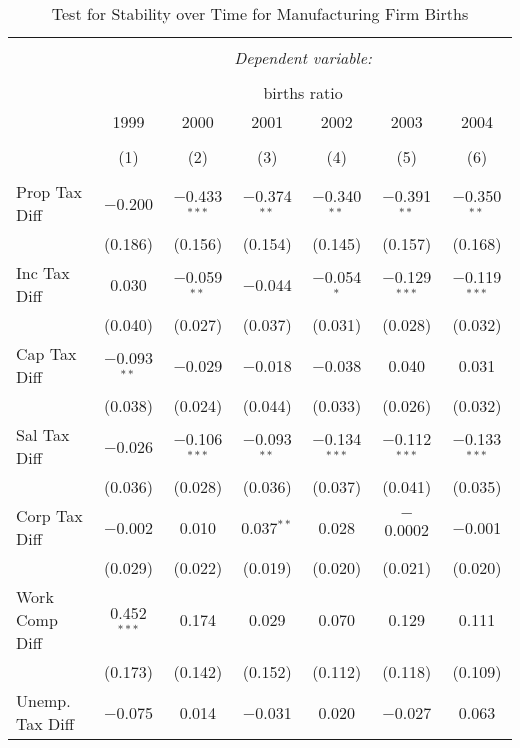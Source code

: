 
\begin{table}[!htbp] \centering 
  \caption{Test for Stability over Time for  Manufacturing Firm Births} 
  \label{31-33year} 
\small 
\begin{tabular}{@{\extracolsep{5pt}}lcccccc} 
\\[-1.8ex]\hline 
\hline \\[-1.8ex] 
 & \multicolumn{6}{c}{\textit{Dependent variable:}} \\ 
\cline{2-7} 
\\[-1.8ex] & \multicolumn{6}{c}{births ratio} \\ 
 & 1999 & 2000 & 2001 & 2002 & 2003 & 2004 \\ 
\\[-1.8ex] & (1) & (2) & (3) & (4) & (5) & (6)\\ 
\hline \\[-1.8ex] 
 Prop Tax Diff & $-$0.200 & $-$0.433$^{***}$ & $-$0.374$^{**}$ & $-$0.340$^{**}$ & $-$0.391$^{**}$ & $-$0.350$^{**}$ \\ 
  & (0.186) & (0.156) & (0.154) & (0.145) & (0.157) & (0.168) \\ 
  Inc Tax Diff & 0.030 & $-$0.059$^{**}$ & $-$0.044 & $-$0.054$^{*}$ & $-$0.129$^{***}$ & $-$0.119$^{***}$ \\ 
  & (0.040) & (0.027) & (0.037) & (0.031) & (0.028) & (0.032) \\ 
  Cap Tax Diff & $-$0.093$^{**}$ & $-$0.029 & $-$0.018 & $-$0.038 & 0.040 & 0.031 \\ 
  & (0.038) & (0.024) & (0.044) & (0.033) & (0.026) & (0.032) \\ 
  Sal Tax Diff & $-$0.026 & $-$0.106$^{***}$ & $-$0.093$^{**}$ & $-$0.134$^{***}$ & $-$0.112$^{***}$ & $-$0.133$^{***}$ \\ 
  & (0.036) & (0.028) & (0.036) & (0.037) & (0.041) & (0.035) \\ 
  Corp Tax Diff & $-$0.002 & 0.010 & 0.037$^{**}$ & 0.028 & $-$0.0002 & $-$0.001 \\ 
  & (0.029) & (0.022) & (0.019) & (0.020) & (0.021) & (0.020) \\ 
  Work Comp Diff & 0.452$^{***}$ & 0.174 & 0.029 & 0.070 & 0.129 & 0.111 \\ 
  & (0.173) & (0.142) & (0.152) & (0.112) & (0.118) & (0.109) \\ 
  Unemp. Tax Diff & $-$0.075 & 0.014 & $-$0.031 & 0.020 & $-$0.027 & 0.063 \\ 

\end{tabular}
\end{table}
